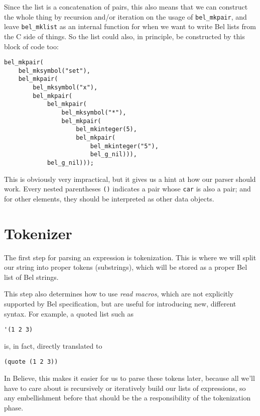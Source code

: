 \documentclass[openright,a4paper,twoside,12pt]{memoir}
\begin{document}
Since the  list is a concatenation  of pairs, this also  means that we
can construct  the whole  thing by recursion  and/or iteration  on the
usage of \texttt{bel\_mkpair}, and leave  \texttt{bel\_mklist} as an internal function for
when we want to write Bel lists from the C side of things. So the list
could also, in principle, be constructed by this block of code too:

\begin{verbatim}
bel_mkpair(
    bel_mksymbol("set"),
    bel_mkpair(
        bel_mksymbol("x"),
        bel_mkpair(
            bel_mkpair(
                bel_mksymbol("*"),
                bel_mkpair(
                    bel_mkinteger(5),
                    bel_mkpair(
                        bel_mkinteger("5"),
                        bel_g_nil))),
            bel_g_nil)));
\end{verbatim}

This is obviously very impractical, but it  gives us a hint at how our
parser should work. Every nested parentheses \texttt{()} indicates a pair whose
\texttt{car} is also a pair; and for other elements, they should be interpreted
as other data objects.

\section{Tokenizer}
\label{sec:orgada9b71}

The  first step  for parsing  an expression  is tokenization.  This is
where we will split our  string into proper tokens (substrings), which
will be stored as a proper Bel list of Bel strings.

This  step also  determines  how to  use \emph{read  macros},  which are  not
explicitly  supported  by  Bel   specification,  but  are  useful  for
introducing new, different syntax. For example, a quoted list such as

\begin{verbatim}
'(1 2 3)
\end{verbatim}

is, in fact, directly translated to

\begin{verbatim}
(quote (1 2 3))
\end{verbatim}

In Believe, this  makes it easier for us to  parse these tokens later,
because all  we'll have  to care about  is recursively  or iteratively
build  our lists  of  expressions, so  any  embellishment before  that
should be the a responsibility of the tokenization phase.
\end{document}
